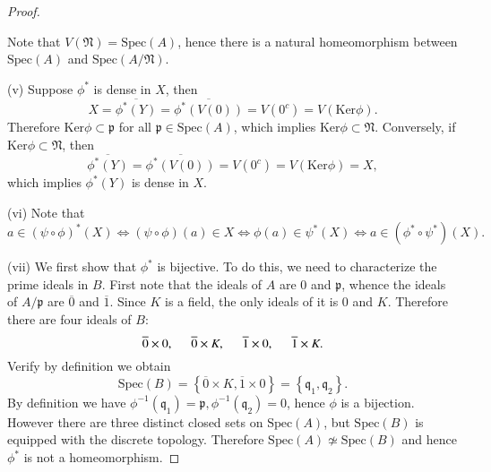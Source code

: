 \begin{proof}
\begin{center}
\begin{tikzpicture}[x=0.75pt,y=0.75pt,yscale=-1,xscale=1]
\end{tikzpicture}
\end{center}
Note that $V(\mathfrak{N})=\mathrm{Spec}(A)$, hence there is a natural homeomorphism between $\mathrm{Spec}(A)$ and $\mathrm{Spec}(A/\mathfrak{N})$.
\par
(v) Suppose $\phi^*$ is dense in $X$, then 
$$
X=\overline{\phi ^*\left( Y \right) }=\overline{\phi ^*\left( V\left( 0 \right) \right) }=V\left( 0^c \right) =V\left( \mathrm{Ker}\phi \right) .
$$
Therefore $\mathrm{Ker}\phi\subset\mathfrak{p}$ for all $\mathfrak{p}\in\mathrm{Spec}(A)$, which implies $\mathrm{Ker}\phi\subset\mathfrak{N}$. Conversely, if $\mathrm{Ker}\phi\subset\mathfrak{N}$, then 
$$
\overline{\phi ^*\left( Y \right) }=\overline{\phi ^*\left( V\left( 0 \right) \right) }=V\left( 0^c \right) =V\left( \mathrm{Ker}\phi \right) =X,
$$
which implies $\phi^*(Y)$ is dense in $X$.\par
(vi) Note that 
$$
a\in \left( \psi \circ \phi \right) ^*\left( X \right) \Longleftrightarrow \left( \psi \circ \phi \right) \left( a \right) \in X\Longleftrightarrow \phi \left( a \right) \in \psi ^*\left( X \right) \Longleftrightarrow a\in \left( \phi ^*\circ \psi ^* \right) \left( X \right) .
$$\par
(vii) We first show that $\phi^*$ is bijective. To do this, we need to characterize the prime ideals in $B$. First note that the ideals of $A$ are $0$ and $\mathfrak{p}$, whence the ideals of $A/\mathfrak{p}$ are $\overline{0}$ and $\overline{1}$. Since $K$ is a field, the only ideals of it is $0$ and $K$. Therefore there are four ideals of $B$: 
$$
\overline{0}\times 0,\hspace{0.5cm}\overline{0}\times K,\hspace{0.5cm}\overline{1}\times 0,\hspace{0.5cm}\overline{1}\times K.
$$
Verify by definition we obtain 
$$
\mathrm{Spec}\left( B \right) =\left\{ \overline{0}\times K,\overline{1}\times 0 \right\} =\left\{ \mathfrak{q} _1,\mathfrak{q} _2 \right\} .
$$
By definition we have $\phi ^{-1}\left( \mathfrak{q} _1 \right) =\mathfrak{p} ,\phi ^{-1}\left( \mathfrak{q} _2 \right) =0$, hence $\phi$ is a bijection. However there are three distinct closed sets on $\mathrm{Spec}(A)$, but $\mathrm{Spec}(B)$ is equipped with the discrete topology. Therefore $\mathrm{Spec}(A)\not\simeq\mathrm{Spec}(B)$ and hence $\phi^*$ is not a homeomorphism.
\end{proof}
